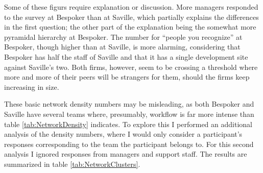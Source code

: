 Some of these figurs require explanation or discussion. More managers responded to the survey at Bespoker than at Saville, which partially explains the differences in the first question; the other part of the explanation being the somewhat more pyramidal hierarchy at Bespoker. The number for  ``people you recognize'' at Bespoker, though higher than at Saville, is more alarming, considering that Bespoker has half the staff of Saville and that it has a single development site against Saville's two. Both firms, however, seem to be crossing a threshold where more and more of their peers will be strangers for them, should the firms keep increasing in size.

These basic network density numbers may be misleading, as both Bespoker and Saville have several teams where, presumably, workflow is far more intense than table \ref{tab:NetworkDensity} indicates. To explore this I performed an additional analysis of the density numbers, where I would only consider a participant's responses corresponding to the team the participant belongs to. For this second analysis I ignored responses from managers and support staff. The results are summarized in table \ref{tab:NetworkClusters}.


